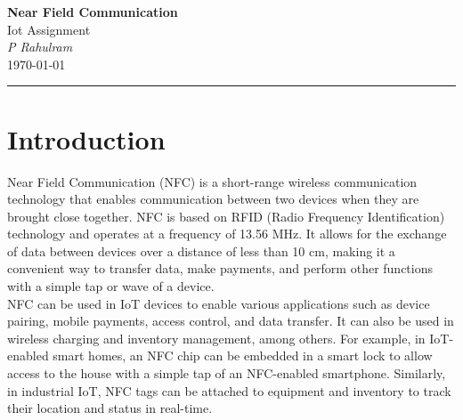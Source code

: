 \documentclass[12pt,a4paper]{article}
\begin{document}
\textcolor{UM_Brown}{
    \begin{center}
        \textbf{\Large Near Field Communication}\\
        \vspace{5pt}
        Iot Assignment \\
        \vspace{20pt}
        \textit{P Rahulram} \\
        \vspace{5pt}
        \today
    \end{center}
\vspace{10pt}
\hrule
}



\section*{Introduction}
Near Field Communication (NFC) is a short-range wireless communication technology that enables communication between two devices when they are brought close together. NFC is based on RFID (Radio Frequency Identification) technology and operates at a frequency of 13.56 MHz. It allows for the exchange of data between devices over a distance of less than 10 cm, making it a convenient way to transfer data, make payments, and perform other functions with a simple tap or wave of a device. \\

NFC can be used in IoT devices to enable various applications such as device pairing, mobile payments, access control, and data transfer. It can also be used in wireless charging and inventory management, among others. For example, in IoT-enabled smart homes, an NFC chip can be embedded in a smart lock to allow access to the house with a simple tap of an NFC-enabled smartphone. Similarly, in industrial IoT, NFC tags can be attached to equipment and inventory to track their location and status in real-time.

\end{document}
